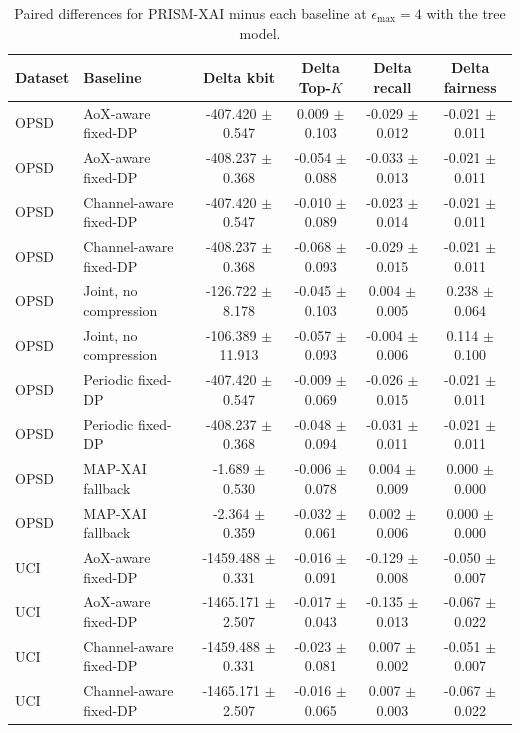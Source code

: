 \begin{table}[t]
\caption{Paired differences for PRISM-XAI minus each baseline at $\epsilon_{\max}=4$ with the tree model.}
\label{tab:paired-differences}
\centering
\scriptsize
\setlength{\tabcolsep}{3pt}
\begin{tabular}{llcccc}
\toprule
Dataset & Baseline & Delta kbit & Delta Top-$K$ & Delta recall & Delta fairness \\
\midrule
OPSD & AoX-aware fixed-DP & -407.420 $\pm$ 0.547 & 0.009 $\pm$ 0.103 & -0.029 $\pm$ 0.012 & -0.021 $\pm$ 0.011 \\
OPSD & AoX-aware fixed-DP & -408.237 $\pm$ 0.368 & -0.054 $\pm$ 0.088 & -0.033 $\pm$ 0.013 & -0.021 $\pm$ 0.011 \\
OPSD & Channel-aware fixed-DP & -407.420 $\pm$ 0.547 & -0.010 $\pm$ 0.089 & -0.023 $\pm$ 0.014 & -0.021 $\pm$ 0.011 \\
OPSD & Channel-aware fixed-DP & -408.237 $\pm$ 0.368 & -0.068 $\pm$ 0.093 & -0.029 $\pm$ 0.015 & -0.021 $\pm$ 0.011 \\
OPSD & Joint, no compression & -126.722 $\pm$ 8.178 & -0.045 $\pm$ 0.103 & 0.004 $\pm$ 0.005 & 0.238 $\pm$ 0.064 \\
OPSD & Joint, no compression & -106.389 $\pm$ 11.913 & -0.057 $\pm$ 0.093 & -0.004 $\pm$ 0.006 & 0.114 $\pm$ 0.100 \\
OPSD & Periodic fixed-DP & -407.420 $\pm$ 0.547 & -0.009 $\pm$ 0.069 & -0.026 $\pm$ 0.015 & -0.021 $\pm$ 0.011 \\
OPSD & Periodic fixed-DP & -408.237 $\pm$ 0.368 & -0.048 $\pm$ 0.094 & -0.031 $\pm$ 0.011 & -0.021 $\pm$ 0.011 \\
OPSD & MAP-XAI fallback & -1.689 $\pm$ 0.530 & -0.006 $\pm$ 0.078 & 0.004 $\pm$ 0.009 & 0.000 $\pm$ 0.000 \\
OPSD & MAP-XAI fallback & -2.364 $\pm$ 0.359 & -0.032 $\pm$ 0.061 & 0.002 $\pm$ 0.006 & 0.000 $\pm$ 0.000 \\
UCI & AoX-aware fixed-DP & -1459.488 $\pm$ 0.331 & -0.016 $\pm$ 0.091 & -0.129 $\pm$ 0.008 & -0.050 $\pm$ 0.007 \\
UCI & AoX-aware fixed-DP & -1465.171 $\pm$ 2.507 & -0.017 $\pm$ 0.043 & -0.135 $\pm$ 0.013 & -0.067 $\pm$ 0.022 \\
UCI & Channel-aware fixed-DP & -1459.488 $\pm$ 0.331 & -0.023 $\pm$ 0.081 & 0.007 $\pm$ 0.002 & -0.051 $\pm$ 0.007 \\
UCI & Channel-aware fixed-DP & -1465.171 $\pm$ 2.507 & -0.016 $\pm$ 0.065 & 0.007 $\pm$ 0.003 & -0.067 $\pm$ 0.022 \\

\end{tabular}
\end{table}
